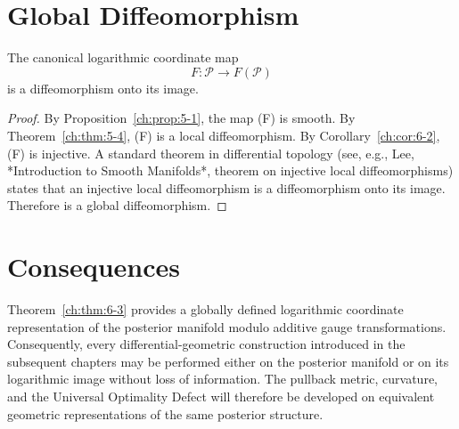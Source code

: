 \section{Global Diffeomorphism}
\begin{theorem}
\label{ch:thm:6-3}
The canonical logarithmic coordinate map
\[
F :
\mathcal P
\longrightarrow
F(\mathcal P)
\]
is a diffeomorphism onto its image.
\end{theorem}
\begin{proof}
By Proposition~\ref{ch:prop:5-1}, the map (F) is smooth.
By Theorem~\ref{ch:thm:5-4}, (F) is a local diffeomorphism.
By Corollary~\ref{ch:cor:6-2}, (F) is injective.
A standard theorem in differential topology (see, e.g., Lee,
*Introduction to Smooth Manifolds*, theorem on injective local
diffeomorphisms) states that an injective local diffeomorphism is a
diffeomorphism onto its image.
Therefore
is a global diffeomorphism. 
\end{proof}
\section{Consequences}
Theorem~\ref{ch:thm:6-3} provides a globally defined logarithmic coordinate
representation of the posterior manifold modulo additive gauge
transformations.
Consequently, every differential-geometric construction introduced in
the subsequent chapters may be performed either on the posterior
manifold or on its logarithmic image without loss of information.
The pullback metric, curvature, and the Universal Optimality Defect will
therefore be developed on equivalent geometric representations of the
same posterior structure.
